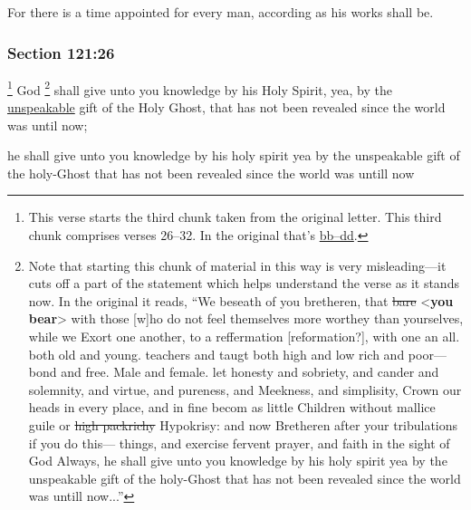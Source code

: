 		For there is a time appointed for every man, according as his works shall be.


	\subsubsection{Section 121:26} %
		\label{DC121-26}

			\footnote{%
				This verse starts the third chunk taken from the original letter. This third chunk comprises verses 26--32. In the original that's \hyperlink{EMS-1839-JS-20-MAR-1839-bb}{bb--dd}.
				}%
		God%
			\footnote{%
				Note that starting this chunk of material in this way is very misleading---it cuts off a part of the statement which helps understand the verse as it stands now. In the original it reads, ``We beseath of you bretheren, that \sout{bare} <\textbf{you bear}> with those [w]ho do not feel themselves more worthey than yourselves, while we Exort one another, to a reffermation [reformation?], with one an all. both old and young. teachers and taugt both high and low rich and poor---bond and free. Male and female. let honesty and sobriety, and cander and solemnity, and virtue, and pureness, and Meekness, and simplisity, Crown our heads in every place, and in fine becom as little Children without mallice guile or \sout{high packrichy} Hypokrisy: and now Bretheren after your tribulations if you do this--- things, and exercise fervent prayer, and faith in the sight of God Always, he shall give unto you knowledge by his holy spirit yea by the unspeakable gift of the holy-Ghost that has not been revealed since the world was untill now...''
				}
		shall give unto you knowledge by his Holy Spirit, yea, by the \hyperref[UNSPEAKABLE]{unspeakable} gift of the Holy Ghost, that has not been revealed since the world was until now;

		\begin{framed}
		\scriptsize
			\begin{compactdesc}
				\item[JSP] he shall give unto you knowledge by his holy spirit yea by the unspeakable gift of the holy-Ghost that has not been revealed since the world was untill now
			\end{compactdesc}
		\end{framed}

